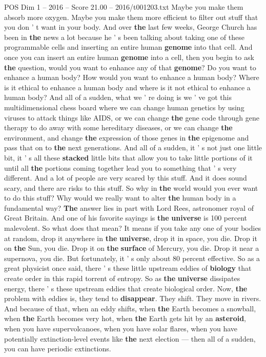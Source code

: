 \begin{textsample}{POS Dim 1 – 2016 – Score 21.00 – 2016/t001203.txt}
Maybe you make them absorb more oxygen.
Maybe you make them more efficient to filter out stuff that you don ' t want in your body.
And over \textbf{the} last few weeks, George Church has been in \textbf{the} news a lot because he ' s been talking about taking one of these programmable cells and inserting an entire human \textbf{genome} into that cell.
And once you can insert an entire human \textbf{genome} into a cell, then you begin to ask \textbf{the} question, would you want to enhance any of that \textbf{genome}?
Do you want to enhance a human body?
How would you want to enhance a human body?
Where is it ethical to enhance a human body and where is it not ethical to enhance a human body?
And all of a sudden, what we ' re doing is we ' ve got this multidimensional chess board where we can change human genetics by using viruses to attack things like AIDS, or we can change \textbf{the} gene code through gene therapy to do away with some hereditary diseases, or we can change \textbf{the} environment, and change \textbf{the} expression of those genes in \textbf{the} epigenome and pass that on to \textbf{the} next generations.
And all of a sudden, it ' s not just one little bit, it ' s all these \textbf{stacked} little bits that allow you to take little portions of it until all \textbf{the} portions coming together lead you to something that ' s very different.
And a lot of people are very scared by this stuff.
And it does sound scary, and there are risks to this stuff.
So why in \textbf{the} world would you ever want to do this stuff?
Why would we really want to alter \textbf{the} human body in a fundamental way? \textbf{The} answer lies in part with Lord Rees, astronomer royal of Great Britain.
And one of his favorite sayings is \textbf{the} \textbf{universe} is 100 percent malevolent.
So what does that mean?
It means if you take any one of your bodies at random, drop it anywhere in \textbf{the} \textbf{universe}, drop it in space, you die.
Drop it on \textbf{the} Sun, you die.
Drop it on \textbf{the} \textbf{surface} of Mercury, you die.
Drop it near a supernova, you die.
But fortunately, it ' s only about 80 percent effective.
So as a great physicist once said, there ' s these little upstream eddies of \textbf{biology} that create order in this rapid torrent of entropy.
So as \textbf{the} \textbf{universe} dissipates energy, there ' s these upstream eddies that create biological order.
Now, \textbf{the} problem with eddies is, they tend to \textbf{disappear}.
They shift.
They move in rivers.
And because of that, when an eddy shifts, when \textbf{the} Earth becomes a snowball, when \textbf{the} Earth becomes very hot, when \textbf{the} Earth gets hit by an \textbf{asteroid}, when you have supervolcanoes, when you have solar flares, when you have potentially extinction-level events like \textbf{the} next election — then all of a sudden, you can have periodic extinctions.

\end{textsample}
